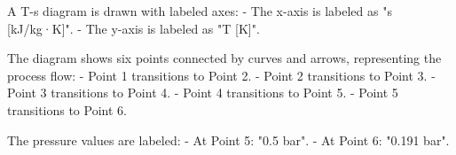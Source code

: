 A T-s diagram is drawn with labeled axes:  
- The x-axis is labeled as "s [kJ/kg·K]".  
- The y-axis is labeled as "T [K]".  

The diagram shows six points connected by curves and arrows, representing the process flow:  
- Point 1 transitions to Point 2.  
- Point 2 transitions to Point 3.  
- Point 3 transitions to Point 4.  
- Point 4 transitions to Point 5.  
- Point 5 transitions to Point 6.  

The pressure values are labeled:  
- At Point 5: "0.5 bar".  
- At Point 6: "0.191 bar".